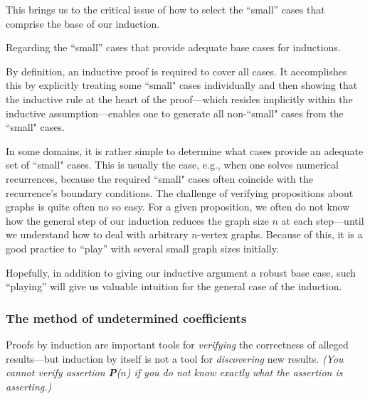 This brings us to the critical issue of how to select the ``small''
cases that comprise the base of our induction.

Regarding the ``small'' cases that provide adequate base cases for inductions.

\smallskip

By definition, an inductive proof is required to cover all cases.  It accomplishes this
by explicitly treating some ``small" cases individually and then showing that the inductive rule 
at the heart of the proof---which resides implicitly within the inductive assumption---enables one
to generate all non-``small" cases from the ``small" cases.

\smallskip

In some domains, it is rather simple to determine what cases provide an adequate set of
``small" cases.  This is usually the case, e.g., when one solves numerical recurrences, because
the required ``small" cases often coincide with the recurrence's boundary conditions.  The
challenge of verifying propositions about graphs is quite often no so easy.  For a given
proposition, we often do not know how the general step of our induction reduces
the graph size $n$ at each step---until we understand how to deal with arbitrary $n$-vertex
graphs.  Because of this, it is a good practice to ``play'' with several small graph sizes initially.

\smallskip

Hopefully, in addition to giving our inductive argument a robust base case, such ``playing'' will
give us valuable intuition for the general case of the induction.


\subsubsection{The method of undetermined coefficients}
\label{sec:undetermined-coefficients1}


Proofs by induction are important tools for {\em verifying} the
correctness of alleged results---but induction by itself is not a tool
for {\em discovering} new results.  {\em (You cannot {\em verify}
  assertion {\bf P}($n$) if you do not know {\em exactly} what the
  assertion is asserting.)}

